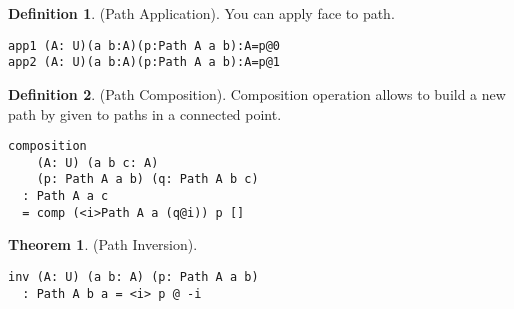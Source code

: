\documentclass{article}
\theoremstyle{definition}
\newtheorem{theorem}{Theorem}
\newtheorem{definition}{Definition}
\begin{document}
\begin{definition} (Path Application).
You can apply face to path.
\begin{lstlisting}
app1 (A: U)(a b:A)(p:Path A a b):A=p@0
app2 (A: U)(a b:A)(p:Path A a b):A=p@1
\end{lstlisting}
\end{definition}

\begin{definition} (Path Composition).
Composition operation allows to build a new path by given to paths
in a connected point.
\begin{center}
\end{center}
\begin{lstlisting}
composition
    (A: U) (a b c: A)
    (p: Path A a b) (q: Path A b c)
  : Path A a c
  = comp (<i>Path A a (q@i)) p []
\end{lstlisting}
\end{definition}

\begin{theorem} (Path Inversion).
\begin{lstlisting}
inv (A: U) (a b: A) (p: Path A a b)
  : Path A b a = <i> p @ -i
\end{lstlisting}
\end{theorem}
\end{document}
